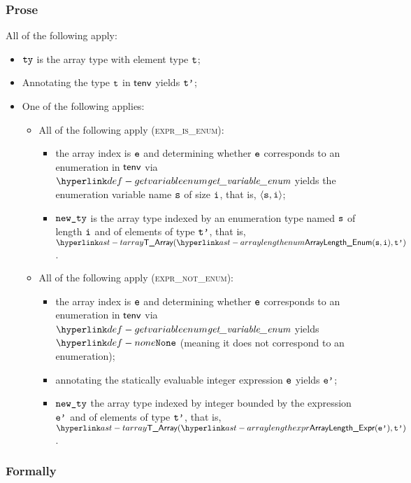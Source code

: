 \subsubsection{Prose}
All of the following apply:
\begin{itemize}
  \item $\tty$ is the array type with element type $\vt$;
  \item Annotating the type $\vt$ in $\tenv$ yields $\vtp$\ProseOrTypeError;
  \item One of the following applies:
  \begin{itemize}
    \item All of the following apply (\textsc{expr\_is\_enum}):
    \begin{itemize}
      \item the array index is $\ve$ and determining whether $\ve$ corresponds to an enumeration in $\tenv$
      via $\getvariableenum$ yields the enumeration variable
      name $\vs$ of size $\vi$, that is, $\langle \vs, \vi \rangle$\ProseOrTypeError;
      \item $\newty$ is the array type indexed by an enumeration type
      named $\vs$ of length $\vi$ and of elements of type $\vtp$, that is, $\TArray(\ArrayLengthEnum(\vs, \vi), \vtp)$.
    \end{itemize}

    \item All of the following apply (\textsc{expr\_not\_enum}):
    \begin{itemize}
      \item the array index is $\ve$ and determining whether $\ve$ corresponds to an enumeration in $\tenv$
      via $\getvariableenum$ yields $\None$ (meaning it does not
      correspond to an enumeration)\ProseOrTypeError;
      \item annotating the statically evaluable integer expression $\ve$ yields
      $\vep$\ProseOrTypeError;
      \item $\newty$ the array type indexed by integer bounded by
      the expression $\vep$ and of elements of type $\vtp$, that is,
      $\TArray(\ArrayLengthExpr(\vep), \vtp)$.
    \end{itemize}
  \end{itemize}
\end{itemize}
\subsubsection{Formally}
\begin{mathpar}
\end{mathpar}

